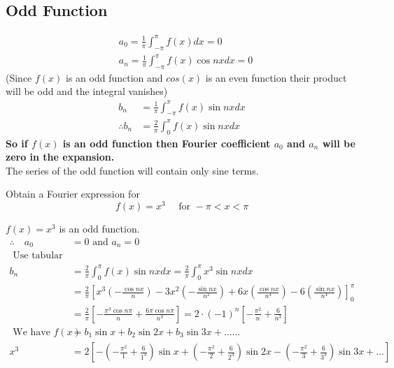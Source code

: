 \subsection{Odd Function}
$$\begin{aligned}
	&a_{0}=\frac{1}{\pi} \int_{-\pi}^{\pi} f(x) d x=0\\
	&a_{n}=\frac{1}{\pi} \int_{-\pi}^{\pi} f(x) \cos n x d x=0 
\end{aligned}$$
(Since $f(x)$ is an odd function and $cos(x)$ is an even function their product will be odd and the integral vanishes)
$$\begin{aligned}
b_{n}&=\frac{1}{\pi} \int_{-\pi}^{\pi} f(x) \sin n x d x\\
\therefore b_{n}&=\frac{2}{\pi} \int_{0}^{\pi} f(x) \sin n x d x
\end{aligned}$$
\textbf{So if $f(x)$ is an odd function then Fourier coefficient $a_0$ and $a_n$ will be zero in the expansion. }\\
The series of the odd function will contain only sine  terms.

\begin{exercise}
	Obtain a Fourier expression for
	$$
	f(x)=x^{3} \quad \text { for }-\pi<x<\pi
	$$
\end{exercise}
\begin{answer}
	$f(x)=x^{3}$ is an odd function. 
	$$
	\begin{aligned}
	\therefore \quad a_{0} & =0 \text { and } a_{n}=0 \\
	\text{ Use tabular integration }\\
	b_{n} & =\frac{2}{\pi} \int_{0}^{\pi} f(x) \sin n x d x=\frac{2}{\pi} \int_{0}^{\pi} x^{3} \sin n x d x \\
	& =\frac{2}{\pi}\left[x^{3}\left(-\frac{\cos n x}{n}\right)-3 x^{2}\left(-\frac{\sin n x}{n^{2}}\right)+6 x\left(\frac{\cos n x}{n^{3}}\right)-6\left(\frac{\sin n x}{n^{4}}\right)\right]_{0}^{\pi} \\
	& =\frac{2}{\pi}\left[-\frac{\pi^{3} \cos n \pi}{n}+\frac{6 \pi \cos n \pi}{n^{3}}\right]=2 \cdot(-1)^{n}\left[-\frac{\pi^{2}}{n}+\frac{6}{n^{3}}\right] \\
 \text{ We have }f(x)&=b_{1} \sin x+b_{2} \sin 2 x+b_{3} \sin 3 x+\ldots \ldots \\
	 x^{3}&=2\left[-\left(-\frac{\pi^{2}}{1}+\frac{6}{1^{3}}\right) \sin x+\left(-\frac{\pi^{2}}{2}+\frac{6}{2^{3}}\right) \sin 2 x-\left(-\frac{\pi^{2}}{3}+\frac{6}{3^{3}}\right) \sin 3 x+\ldots\right] 
	\end{aligned}
	$$
\end{answer}

